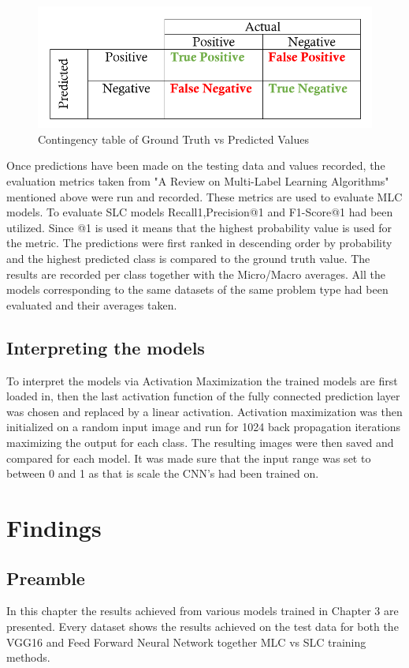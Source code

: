 \documentclass{csfyp}
\begin{document}
\begin{figure}[!htbp]
\centering
\includegraphics[scale=0.35]{TPFP.pdf}
\caption{Contingency table of Ground Truth vs Predicted Values }
\end{figure}

Once predictions have been made on the testing data and values recorded, the evaluation metrics taken from "A Review on Multi-Label Learning Algorithms"~\cite{6471714} mentioned above were run and recorded. These metrics are used to evaluate MLC models. To evaluate SLC models \Gls{Recall1},Precision@1 and F1-Score@1 had been utilized. Since @1 is used it means that the highest probability value is used for the metric. The predictions were first ranked in descending order by probability and the highest predicted class is compared to the ground truth value. The results are recorded per class together with the Micro/Macro averages. All the models corresponding to the same datasets of the same problem type had been evaluated and their averages taken.

\subsection{Interpreting the models}
To interpret the models via Activation Maximization the trained models are first loaded in, then the last activation function of the fully connected prediction layer was chosen and replaced by a linear activation. Activation maximization was then initialized on a random input image and run for 1024 back propagation iterations maximizing the output for each class. The resulting images were then saved and compared for each model. It was made sure that the input range was set to between 0 and 1 as that is scale the CNN's had been trained on.

\section{Findings}
\subsection{Preamble}
In this chapter the results achieved from various models trained in Chapter 3 are presented. Every dataset shows the results achieved on the test data for both the VGG16 and Feed Forward Neural Network together MLC vs SLC training methods.
\end{document}
